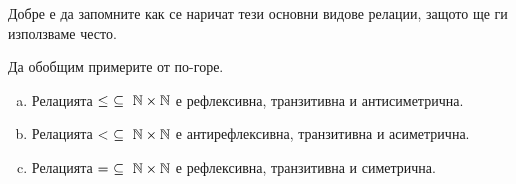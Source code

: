 \begin{remark}
  Добре е да запомните как се наричат тези основни видове релации,
  защото ще ги използваме често.
\end{remark}

\begin{example}
  Да обобщим примерите от по-горе.
  \begin{enumerate}[a)]
  \item
    Релацията $\leq\ \subseteq\ \Nat\times\Nat$ е рефлексивна, транзитивна и антисиметрична.
  \item
    Релацията $<\ \subseteq\ \Nat\times\Nat$ е антирефлексивна, транзитивна и асиметрична.
  \item
    Релацията $=\ \subseteq\ \Nat\times\Nat$ е рефлексивна, транзитивна и симетрична.
  \end{enumerate}
\end{example}

